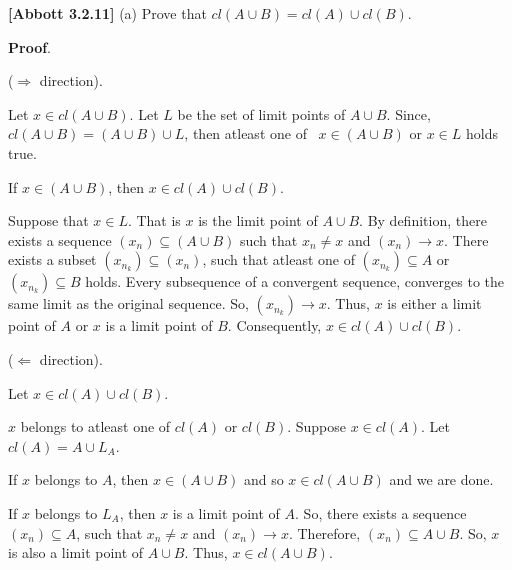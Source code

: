 \documentclass[10pt]{article}
\begin{document}
\textbf{[Abbott 3.2.11]} (a) Prove that $\displaystyle cl( A\cup B) =cl( A) \cup cl( B)$. 



\textbf{Proof}.



($\displaystyle \Longrightarrow $ direction).

Let $\displaystyle x\in cl( A\cup B)$. Let $\displaystyle L$ be the set of limit points of $\displaystyle A\cup B$. Since, $\displaystyle cl( A\cup B) =( A\cup B) \cup L$, then atleast one of \ $\displaystyle x\in ( A\cup B)$ or $\displaystyle x\in L$ holds true.



If $\displaystyle x\in ( A\cup B)$, then $\displaystyle x\in cl( A) \cup cl( B)$. 



Suppose that $\displaystyle x\in L$. That is $\displaystyle x$ is the limit point of $\displaystyle A\cup B$. By definition, there exists a sequence $\displaystyle ( x_{n}) \subseteq ( A\cup B)$ such that $\displaystyle x_{n} \neq x$ and $\displaystyle ( x_{n})\rightarrow x$. There exists a subset $\displaystyle ( x_{n_{k}}) \subseteq ( x_{n})$, such that atleast one of $\displaystyle ( x_{n_{k}}) \subseteq A$ or $\displaystyle ( x_{n_{k}}) \subseteq B$ holds. Every subsequence of a convergent sequence, converges to the same limit as the original sequence. So, $\displaystyle ( x_{n_{k}})\rightarrow x$. Thus, $\displaystyle x$ is either a limit point of $\displaystyle A$ or $\displaystyle x$ is a limit point of $\displaystyle B$. Consequently, $\displaystyle x\in cl( A) \cup cl( B)$.



($\displaystyle \Longleftarrow $ direction). 



Let $\displaystyle x\in cl( A) \cup cl( B)$.



$\displaystyle x$ belongs to atleast one of $\displaystyle cl( A)$ or $\displaystyle cl( B)$. Suppose $\displaystyle x\in cl( A)$. Let $\displaystyle cl( A) =A\cup L_{A}$. 



If $\displaystyle x$ belongs to $\displaystyle A$, then $\displaystyle x\in ( A\cup B)$ and so $\displaystyle x\in cl( A\cup B)$ and we are done.



If $\displaystyle x$ belongs to $\displaystyle L_{A}$, then $\displaystyle x$ is a limit point of $\displaystyle A$. So, there exists a sequence $\displaystyle ( x_{n}) \subseteq A$, such that $\displaystyle x_{n} \neq x$ and $\displaystyle ( x_{n})\rightarrow x$. Therefore, $\displaystyle ( x_{n}) \subseteq A\cup B$. So, $\displaystyle x$ is also a limit point of $\displaystyle A\cup B$. Thus, $\displaystyle x\in cl( A\cup B)$. 
\end{document}
